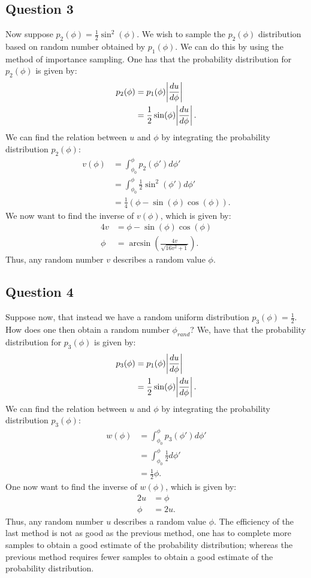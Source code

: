 \documentclass[a4paper]{article}
\begin{document}
\subsection*{Question 3}
Now suppose $p_2(\phi) = \frac{1}{2}\sin^2(\phi)$. We wish to sample the $p_2(\phi)$ distribution based on random number obtained by $p_1(\phi)$.
We can do this by using the method of importance sampling.
One has that the probability distribution for $p_2(\phi)$ is given by:
\begin{align*}
    p_2(\phi) &= p_1(\phi)\abs{\frac{du}{d\phi}}\\
    &= \frac{1}{2}\sin(\phi)\abs{\frac{du}{d\phi}}.
\end{align*}We can find the relation between $u$ and $\phi$ by integrating the probability distribution $p_2(\phi)$:
\begin{align*}
    v(\phi) &= \int_{\phi_0}^\phi p_2(\phi')d{\phi'}\\
    &= \int_{\phi_0}^\phi \frac{1}{2}\sin^2(\phi')d{\phi'}\\
    &= \frac{1}{4}\left(\phi - \sin(\phi)\cos(\phi)\right).
\end{align*}We now want to find the inverse of $v(\phi)$, which is given by:
\begin{align*}
    4v &= \phi - \sin(\phi)\cos(\phi)\\
    \phi &= \arcsin\left(\frac{4v}{\sqrt{16v^2 + 1}}\right).
\end{align*}Thus, any random number $v$ describes a random value $\phi$.

\subsection*{Question 4}
Suppose now, that instead we have a random uniform distribution $p_3(\phi) = \frac{1}{2}$.
How does one then obtain a random number $\phi_{rand}$?
We, have that the probability distribution for $p_3(\phi)$ is given by:
\begin{align*}
    p_3(\phi) &= p_1(\phi)\abs{\frac{du}{d\phi}}\\
    &= \frac{1}{2}\sin(\phi)\abs{\frac{du}{d\phi}}.
\end{align*}We can find the relation between $u$ and $\phi$ by integrating the probability distribution $p_3(\phi)$:
\begin{align*}
    w(\phi) &= \int_{\phi_0}^\phi p_3(\phi')d{\phi'}\\
    &= \int_{\phi_0}^\phi \frac{1}{2}d{\phi'}\\
    &= \frac{1}{2}\phi.
\end{align*}One now want to find the inverse of $w(\phi)$, which is given by:
\begin{align*}
    2u &= \phi\\
    \phi &= 2u.
\end{align*}Thus, any random number $u$ describes a random value $\phi$.
The efficiency of the last method is not as good as the previous method, one has to complete more samples to obtain a good estimate of the probability distribution; whereas the previous method requires fewer samples to obtain a good estimate of the probability distribution.
\end{document}
